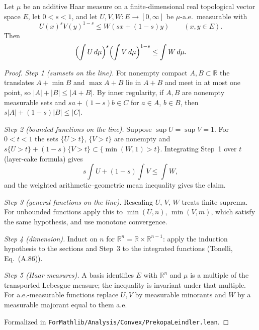 \begin{theorem}\label{thm:sg-tal:st-prekopa-leindler}
  \leanok
{}
Let $\mu$ be an additive Haar measure on a finite-dimensional real topological vector space $E$, let
$0<s<1$, and let $U,V,W:E\to[0,\infty]$ be $\mu$-a.e.\ measurable with
\[
U(x)^sV(y)^{1-s}\le W(sx+(1-s)y)\qquad(x,y\in E).
\]
Then
\[
\Bigl(\int U\,d\mu\Bigr)^s\Bigl(\int V\,d\mu\Bigr)^{1-s}\le\int W\,d\mu .
\]
\end{theorem}
\begin{proof}
  \leanok
\emph{Step 1 (sumsets on the line).} For nonempty compact $A,B\subset\mathbb R$ the translates $A+\min B$
and $\max A+B$ lie in $A+B$ and meet in at most one point, so $|A|+|B|\le|A+B|$. By inner regularity, if
$A,B$ are nonempty measurable sets and $sa+(1-s)b\in C$ for $a\in A$, $b\in B$, then
$s|A|+(1-s)|B|\le|C|$.

\emph{Step 2 (bounded functions on the line).} Suppose $\sup U=\sup V=1$. For $0<t<1$ the sets $\{U>t\}$,
$\{V>t\}$ are nonempty and $s\{U>t\}+(1-s)\{V>t\}\subset\{\min(W,1)>t\}$. Integrating Step~1 over $t$
(layer-cake formula) gives
\[
s\int U+(1-s)\int V\le\int W,
\]
and the weighted arithmetic--geometric mean inequality gives the claim.

\emph{Step 3 (general functions on the line).} Rescaling $U$, $V$, $W$ treats finite suprema. For
unbounded functions apply this to $\min(U,n)$, $\min(V,m)$, which satisfy the same hypothesis, and use
monotone convergence.

\emph{Step 4 (dimension).} Induct on $n$ for $\mathbb R^n=\mathbb R\times\mathbb R^{n-1}$: apply the
induction hypothesis to the sections and Step~3 to the integrated functions (Tonelli, Eq.~(A.86)).

\emph{Step 5 (Haar measures).} A basis identifies $E$ with $\mathbb R^n$ and $\mu$ is a multiple of the
transported Lebesgue measure; the inequality is invariant under that multiple. For a.e.-measurable
functions replace $U,V$ by measurable minorants and $W$ by a measurable majorant equal to them a.e.

Formalized in \texttt{ForMathlib/Analysis/Convex/PrekopaLeindler.lean}.
\end{proof}

